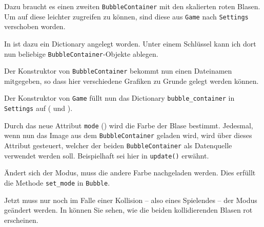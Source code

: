 Dazu braucht es einen zweiten \texttt{BubbleContainer} mit den skalierten roten Blasen. Um auf diese leichter zugreifen zu können, sind diese aus \texttt{Game} nach \texttt{Settings} verschoben worden. 

In  ist dazu ein Dictionary angelegt worden. Unter einem Schlüssel kann ich dort nun beliebige \texttt{BubbleContainer}-Objekte ablegen.


Der Konstruktor von \texttt{BubbleContainer} bekommt nun einen Dateinamen mitgegeben, so dass hier verschiedene Grafiken zu Grunde gelegt werden können.


Der Konstruktor von \texttt{Game} füllt nun das Dictionary \texttt{bubble\_container} in \texttt{Settings} auf ( und ).


Durch das neue Attribut \texttt{mode} () wird die Farbe der Blase bestimmt. Jedesmal, wenn nun das Image aus dem \texttt{BubbleContainer} geladen wird, wird über dieses Attribut gesteuert, welcher der beiden \texttt{BubbleContainer} als Datenquelle verwendet werden soll. Beispielhaft sei hier  in \texttt{update()} erwähnt.


Ändert sich der Modus, muss die andere Farbe nachgeladen werden. Dies erfüllt die Methode \texttt{set\_mode} in \texttt{Bubble}.


Jetzt muss nur noch im Falle einer Kollision -- also eines Spielendes -- der Modus geändert werden. In  können Sie sehen, wie die beiden kollidierenden Blasen rot erscheinen. 

